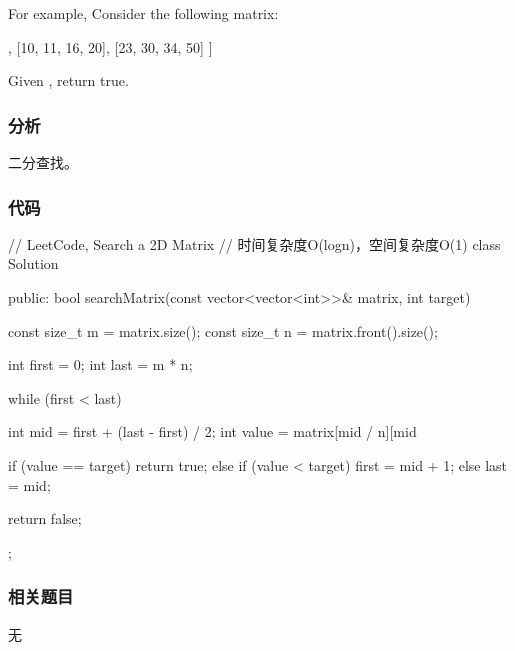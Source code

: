 For example, Consider the following matrix:
\begin{Code}
[
  [1,   3,  5,  7],
  [10, 11, 16, 20],
  [23, 30, 34, 50]
]
\end{Code}
Given , return true.


\subsubsection{分析}
二分查找。


\subsubsection{代码}
\begin{Code}
// LeetCode, Search a 2D Matrix
// 时间复杂度O(logn)，空间复杂度O(1)
class Solution {
public:
    bool searchMatrix(const vector<vector<int>>& matrix, int target) {
        const size_t  m = matrix.size();
        const size_t n = matrix.front().size();

        int first = 0;
        int last = m * n;

        while (first < last) {
            int mid = first + (last - first) / 2;
            int value = matrix[mid / n][mid %

            if (value == target)
                return true;
            else if (value < target)
                first = mid + 1;
            else
                last = mid;
        }

        return false;
    }
};
\end{Code}


\subsubsection{相关题目}
\begindot
\item 无
\myenddot
